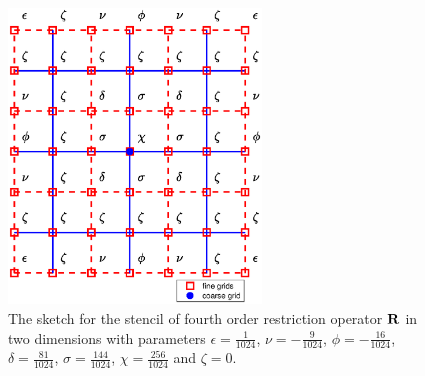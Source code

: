 \begin{figure}[htbp]
	\centering
	\includegraphics[width=0.6\textwidth]{restriction.eps}
	\caption{The sketch for the stencil of fourth order restriction operator ${\bf R}$ in two dimensions with parameters $\epsilon = \frac{1}{1024}$, $\nu = -\frac{9}{1024}$, $\phi = -\frac{16}{1024}$, $\delta = \frac{81}{1024}$, $\sigma = \frac{144}{1024}$, $\chi = \frac{256}{1024}$ and $\zeta = 0$.}\label{restriction}
\end{figure}

